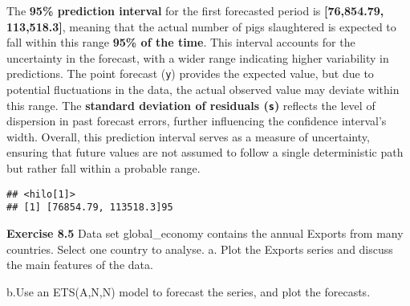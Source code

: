 \documentclass[
]{article}
\newenvironment{Shaded}{\begin{snugshade}}{\end{snugshade}}
\newcommand{\DecValTok}[1]{\textcolor[rgb]{0.00,0.00,0.81}{#1}}
\newcommand{\FunctionTok}[1]{\textcolor[rgb]{0.13,0.29,0.53}{\textbf{#1}}}
\newcommand{\NormalTok}[1]{#1}
\newcommand{\OtherTok}[1]{\textcolor[rgb]{0.56,0.35,0.01}{#1}}
\newcommand{\SpecialCharTok}[1]{\textcolor[rgb]{0.81,0.36,0.00}{\textbf{#1}}}
\newcommand{\StringTok}[1]{\textcolor[rgb]{0.31,0.60,0.02}{#1}}
\begin{document}
The \textbf{95\% prediction interval} for the first forecasted period is
\textbf{{[}76,854.79, 113,518.3{]}}, meaning that the actual number of
pigs slaughtered is expected to fall within this range \textbf{95\% of
the time}. This interval accounts for the uncertainty in the forecast,
with a wider range indicating higher variability in predictions. The
point forecast (\texttt{y}) provides the expected value, but due to
potential fluctuations in the data, the actual observed value may
deviate within this range. The \textbf{standard deviation of residuals
(\texttt{s})} reflects the level of dispersion in past forecast errors,
further influencing the confidence interval's width. Overall, this
prediction interval serves as a measure of uncertainty, ensuring that
future values are not assumed to follow a single deterministic path but
rather fall within a probable range.

\begin{Shaded}
\end{Shaded}

\begin{verbatim}
## <hilo[1]>
## [1] [76854.79, 113518.3]95
\end{verbatim}

\textbf{Exercise 8.5} Data set global\_economy contains the annual
Exports from many countries. Select one country to analyse. a. Plot the
Exports series and discuss the main features of the data.

b.Use an ETS(A,N,N) model to forecast the series, and plot the
forecasts.
\end{document}
